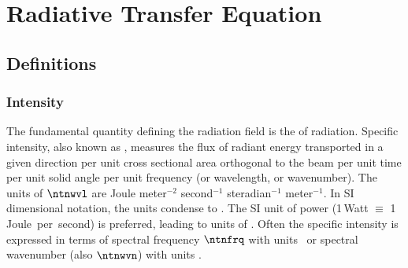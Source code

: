 \documentclass[12pt]{article}
\begin{document}
\section{Radiative Transfer Equation}\label{sxn:rte}

\subsection{Definitions}

\subsubsection[Intensity]{Intensity}\label{sxn:ntn}
The fundamental quantity defining the radiation field is the
 of radiation.
Specific intensity, also known as , measures the flux
of radiant energy transported in a given direction per unit cross 
sectional area orthogonal to the beam per unit time per unit solid
angle per unit frequency (or wavelength, or wavenumber). 
The units of $\ntnwvl$ are
Joule meter$^{-2}$ second$^{-1}$ steradian$^{-1}$ meter$^{-1}$. 
In SI dimensional notation, the units condense to \jxmSssrm.
The SI unit of power (1\,Watt $\equiv$ 1\,Joule~per~second) is
preferred, leading to units of \wxmSsrm.
Often the specific intensity is expressed in terms of spectral
frequency $\ntnfrq$ with units \wxmSsrhz\ or
spectral wavenumber (also $\ntnwvn$) with units \wxmSsrwvn.
\end{document}
